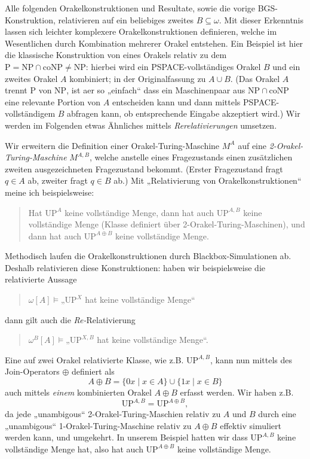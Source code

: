 \documentclass[nofonts]{uebung}
\theoremstyle{definition}
\def\P{\ensuremath{\mathrm{P}}}
\def\NP{\ensuremath{\mathrm{NP}}}
\def\UP{\ensuremath{\mathrm{UP}}}
\def\coNP{\ensuremath{\mathrm{coNP}}}
\begin{document}
Alle folgenden Orakelkonstruktionen und Resultate, sowie die vorige BGS-Konstruktion, relativieren auf ein beliebiges zweites $B\subseteq\omega$.
Mit dieser Erkenntnis lassen sich leichter komplexere Orakelkonstruktionen definieren, welche im Wesentlichen durch Kombination mehrerer Orakel entstehen. Ein Beispiel ist hier die klassische Konstruktion von \citeauthor{baker_relativizations_1975} eines Orakels relativ zu dem $\P=\NP\cap\coNP\neq\NP$: hierbei wird ein PSPACE-vollständiges Orakel $B$ und ein zweites Orakel $A$ kombiniert; in der Originalfassung zu $A\cup B$. (Das Orakel $A$ trennt $\P$ von $\NP$, ist aer so „einfach“ dass ein Maschinenpaar aus $\NP\cap\coNP$ eine relevante Portion von $A$ entscheiden kann und dann mittels PSPACE-vollständigem $B$ abfragen kann, ob entsprechende Eingabe akzeptiert wird.) Wir werden im Folgenden etwas Ähnliches mittels \emph{Rerelativierungen} umsetzen.

Wir erweitern die Definition einer Orakel-Turing-Maschine $M^A$ auf eine \emph{2-Orakel-Turing-Maschine} $M^{A,B}$, welche anstelle eines Fragezustands einen zusätzlichen zweiten ausgezeichneten Fragezustand bekommt. (Erster Fragezustand fragt $q\in A$ ab, zweiter fragt $q\in B$ ab.)
Mit „Relativierung von Orakelkonstruktionen“ meine ich beispielsweise: 
\begin{quote}
    Hat $\UP^A$ keine vollständige Menge, dann hat auch $\UP^{A,B}$ keine vollständige Menge (Klasse definiert über 2-Orakel-Turing-Maschinen), und dann hat auch $\UP^{A\oplus B}$ keine vollständige Menge.
\end{quote}

Methodisch laufen die Orakelkonstruktionen durch Blackbox-Simulationen ab. Deshalb relativieren diese Konstruktionen:
haben wir beispielsweise die relativierte Aussage \begin{quote}$\omega[A]\vDash „\UP^X$ hat keine vollständige Menge“\end{quote}  dann gilt auch die \emph{Re-}Relativierung \begin{quote}$\omega^B[A]\vDash „\UP^{X,B}$ hat keine vollständige Menge“.\end{quote}
Eine auf zwei Orakel relativierte Klasse, wie z.B. $\UP^{A,B}$, kann nun mittels des Join-Operators $\oplus$ definiert als
\[ A\oplus B = \{0x\mid x\in A\}\cup\{1x\mid x\in B\} \] 
auch mittels \emph{einem} kombinierten Orakel $A\oplus B$ erfasst werden. Wir haben z.B.
\[ \UP^{A,B} = \UP^{A\oplus B}, \]
da jede „unambigous“ 2-Orakel-Turing-Maschien relativ zu $A$ und $B$ durch eine „unambigous“ 1-Orakel-Turing-Maschine relativ zu $A\oplus B$ effektiv simuliert werden kann, und umgekehrt.
In unserem Beispiel hatten wir dass $\UP^{A,B}$ keine vollständige Menge hat, also hat auch $\UP^{A\oplus B}$ keine vollständige Menge.
\end{document}
